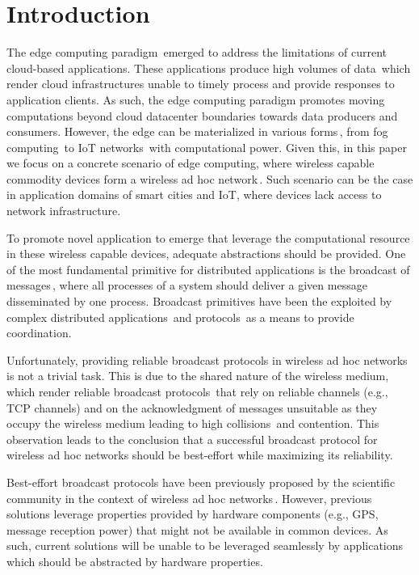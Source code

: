 \documentclass[conference]{IEEEtran}
\begin{document}
\section{Introduction}
The edge computing paradigm\,\cite{edgevision} emerged to address the limitations of current cloud-based applications. These applications produce high volumes of data\,\cite{datagrow} which render cloud infrastructures unable to timely process and provide responses to application clients. As such, the edge computing paradigm promotes moving computations beyond cloud datacenter boundaries towards data producers and consumers. However, the edge can be materialized in various forms\,\cite{tr:nosso}, from fog computing\,\cite{fog} to IoT networks\,\cite{iot,iot2} with computational power. Given this, in this paper we focus on a concrete scenario of edge computing, where wireless capable commodity devices form a wireless ad hoc network\,\cite{akos:msc}. Such scenario can be the case in application domains of smart cities and IoT, where devices lack access to network infrastructure.

To promote novel application to emerge that leverage the computational resource in these wireless capable devices, adequate abstractions should be provided. One of the most fundamental primitive for distributed applications is the broadcast of messages\,\cite{broadcast}, where all processes of a system should deliver a given message disseminated by one process. Broadcast primitives have been the exploited by complex distributed applications\,\cite{groupcommunication} and protocols\,\cite{concensus} as a means to provide coordination.

Unfortunately, providing reliable broadcast protocols in wireless ad hoc networks is not a trivial task. This is due to the shared nature of the wireless medium, which render reliable broadcast protocols\,\cite{plumtree} that rely on reliable channels (e.g., TCP channels) and on the acknowledgment of messages unsuitable as they occupy the wireless medium leading to high collisions\,\cite{broadcaststorm} and contention. This observation leads to the conclusion that a successful broadcast protocol for wireless ad hoc networks should be best-effort while maximizing its reliability.

Best-effort broadcast protocols have been previously proposed by the scientific community in the context of wireless ad hoc networks\,\cite{pampa,flowaware,survey}. However, previous solutions leverage properties provided by hardware components (e.g., GPS, message reception power) that might not be available in common devices. As such, current solutions will be unable to be leveraged seamlessly by applications which should be abstracted by hardware properties.
\end{document}
